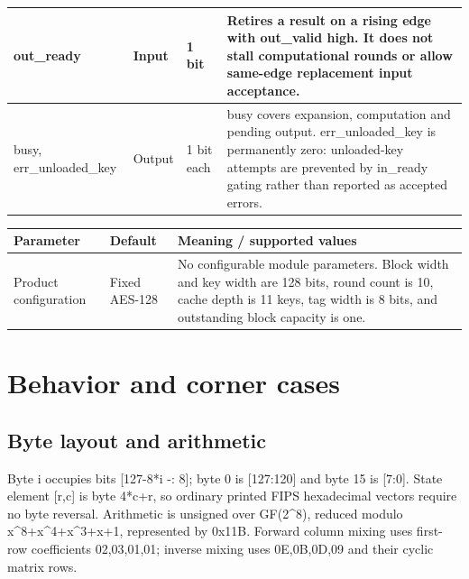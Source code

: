 \documentclass[11pt,a4paper]{article}
\begin{document}
{\begin{longtable}{@{}L{0.21\textwidth}|L{0.12\textwidth}|L{0.12\textwidth}|L{0.45\textwidth}@{}}
out\_\allowbreak{}ready & Input & 1 bit & Retires a result on a rising edge with out\_\allowbreak{}valid high. It does not stall computational rounds or allow same-edge replacement input acceptance.\\[2pt]\hline

busy,\allowbreak{} err\_\allowbreak{}unloaded\_\allowbreak{}key & Output & 1 bit each & busy covers expansion,\allowbreak{} computation and pending output. err\_\allowbreak{}unloaded\_\allowbreak{}key is permanently zero: unloaded-key attempts are prevented by in\_\allowbreak{}ready gating rather than reported as accepted errors.\\[2pt]\hline

\bottomrule\end{longtable}}

{\small\renewcommand{\arraystretch}{1.18}\begin{longtable}{@{}L{0.22\textwidth}|L{0.21\textwidth}|L{0.49\textwidth}@{}}\toprule

\textbf{Parameter} & \textbf{Default} & \textbf{Meaning /\allowbreak{} supported values}\\\midrule\endhead

Product configuration & Fixed AES-128 & No configurable module parameters. Block width and key width are 128 bits,\allowbreak{} round count is 10,\allowbreak{} cache depth is 11 keys,\allowbreak{} tag width is 8 bits,\allowbreak{} and outstanding block capacity is one.\\[2pt]\hline

\bottomrule\end{longtable}}

\section{Behavior and corner cases}

\subsection{Byte layout and arithmetic}

Byte i occupies bits [\allowbreak{}127-8*\allowbreak{}i -: 8]\allowbreak{}; byte 0 is [\allowbreak{}127:120]\allowbreak{} and byte 15 is [\allowbreak{}7:0]\allowbreak{}. State element [\allowbreak{}r,\allowbreak{}c]\allowbreak{} is byte 4*\allowbreak{}c+\allowbreak{}r,\allowbreak{} so ordinary printed FIPS hexadecimal vectors require no byte reversal. Arithmetic is unsigned over GF(\allowbreak{}2\textasciicircum{}8)\allowbreak{},\allowbreak{} reduced modulo x\textasciicircum{}8+\allowbreak{}x\textasciicircum{}4+\allowbreak{}x\textasciicircum{}3+\allowbreak{}x+\allowbreak{}1,\allowbreak{} represented by 0x11B. Forward column mixing uses first-row coefficients 02,\allowbreak{}03,\allowbreak{}01,\allowbreak{}01; inverse mixing uses 0E,\allowbreak{}0B,\allowbreak{}0D,\allowbreak{}09 and their cyclic matrix rows.
\end{document}
